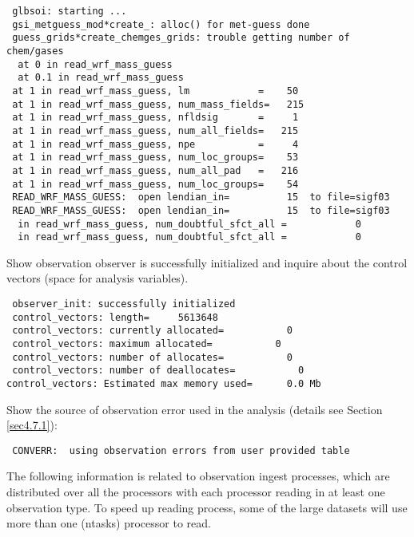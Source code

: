\begin{scriptsize}
\begin{verbatim}
 glbsoi: starting ...
 gsi_metguess_mod*create_: alloc() for met-guess done
 guess_grids*create_chemges_grids: trouble getting number of chem/gases
  at 0 in read_wrf_mass_guess
  at 0.1 in read_wrf_mass_guess
 at 1 in read_wrf_mass_guess, lm            =    50
 at 1 in read_wrf_mass_guess, num_mass_fields=   215
 at 1 in read_wrf_mass_guess, nfldsig       =     1
 at 1 in read_wrf_mass_guess, num_all_fields=   215
 at 1 in read_wrf_mass_guess, npe           =     4
 at 1 in read_wrf_mass_guess, num_loc_groups=    53
 at 1 in read_wrf_mass_guess, num_all_pad   =   216
 at 1 in read_wrf_mass_guess, num_loc_groups=    54
 READ_WRF_MASS_GUESS:  open lendian_in=          15  to file=sigf03
 READ_WRF_MASS_GUESS:  open lendian_in=          15  to file=sigf03
  in read_wrf_mass_guess, num_doubtful_sfct_all =            0
  in read_wrf_mass_guess, num_doubtful_sfct_all =            0

\end{verbatim}
\end{scriptsize}

Show observation observer is successfully initialized and inquire about the control vectors (space for analysis variables).

\begin{scriptsize}
\begin{verbatim}
 observer_init: successfully initialized
 control_vectors: length=     5613648
 control_vectors: currently allocated=           0
 control_vectors: maximum allocated=           0
 control_vectors: number of allocates=           0
 control_vectors: number of deallocates=           0
control_vectors: Estimated max memory used=      0.0 Mb
\end{verbatim}
\end{scriptsize}
Show the source of observation error used in the analysis (details see Section \ref{sec4.7.1}):
\begin{scriptsize}
\begin{verbatim}
 CONVERR:  using observation errors from user provided table
\end{verbatim}
\end{scriptsize}

The following information is related to observation ingest processes, which are distributed over all the processors with each processor reading in at least one observation type. To speed up reading process, some of the large datasets will use more than one (ntasks) processor to read.

